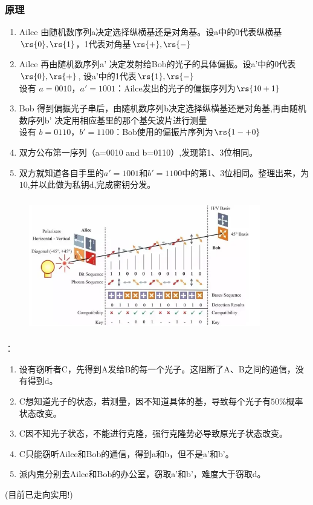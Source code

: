 \begin{frame}
    \frametitle{原理}
    \begin{enumerate}
        \item Ailce 由随机数序列a决定选择纵横基还是对角基。设a中的0代表纵横基{$\rs{0},\rs{1}$}，1代表对角基{$\rs{+},\rs{-}$} 
        \item Ailce 再由随机数序列a' 决定发射给Bob的光子的具体偏振。设a'中的0代表$\rs{0},\rs{+}$, 设a'中的1代表$\rs{1},\rs{-}$\\
        \hspace{2em} 设有 $a=0010$，$a'=1001$：Ailce发出的光子的偏振序列为$\rs{10+1}$
        \item Bob 得到偏振光子串后，由随机数序列b决定选择纵横基还是对角基,再由随机数序列b' 决定用相应基里的那个基矢波片进行测量\\
        \hspace{2em} 设有 $b=0110$，$b'=1100$：Bob使用的偏振片序列为$\rs{1-+0}$ 
        \item 双方公布第一序列（a=0010 and b=0110）,发现第1、3位相同。
        \item 双方就知道各自手里的$a'=1001$和$b'=1100$中的第1、3位相同。整理出来，为$10$,并以此做为私钥d,完成密钥分发。
    \end{enumerate}
\end{frame}

\begin{frame}
  \frametitle{}
  \begin{figure}[htbp]
      \centering
      \includegraphics[width=0.9\textwidth]{figs/2022-03-17-00-33-08.png}
  \end{figure}
\end{frame}


\begin{frame}
    \frametitle{}
    {\color{red}{保密性分析}}：
    \begin{enumerate}
        \item 设有窃听者C，先得到A发给B的每一个光子。这阻断了A、B之间的通信，没有得到d。
        \item C想知道光子的状态，若测量，因不知道具体的基，导致每个光子有$50\%$概率状态改变。
        \item C因不知光子状态，不能进行克隆，强行克隆势必导致原光子状态改变。
        \item C只能窃听Ailce和Bob的通信，得到a和b，但不是a'和b'。
        \item 派内鬼分别去Ailce和Bob的办公室，窃取a'和b'，难度大于窃取d。
    \end{enumerate}
    (目前已走向实用!)
\end{frame}

